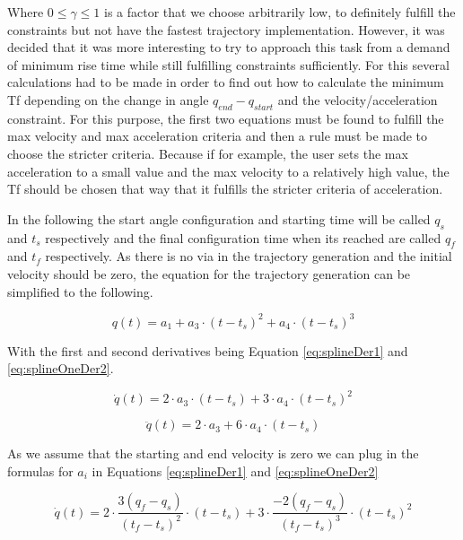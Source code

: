 Where $ 0\leq \gamma \leq 1$ is a factor that we choose arbitrarily low, to definitely fulfill the constraints but not have the fastest trajectory implementation. \newline 
However, it was decided that it was more interesting to try to approach this task from a demand of minimum rise time while still fulfilling constraints sufficiently. For this several calculations had to be made in order to find out how to calculate the minimum Tf depending on the change in angle $q_{end}- q_{start}$ and the velocity/acceleration constraint. For this purpose, the first two equations must be found to fulfill the max velocity and max acceleration criteria and then a rule must be made to choose the stricter criteria. Because if for example, the user sets the max acceleration to a small value and the max velocity to a relatively high value, the Tf should be chosen that way that it fulfills the stricter criteria of acceleration. 

\newline 
In the following the start angle configuration and starting time will be called $q_s$ and $t_s$ respectively and the final configuration time when its reached are called $q_f$ and $t_f$ respectively.
As there is no via in the trajectory generation and the initial velocity should be zero, the equation for the trajectory generation can be simplified to the following.

\begin{equation}
    q(t) = a_{1} + a_{3} \cdot (t-t_{s})^2 + a_{4}\cdot (t-t_{s})^3
    \label{eq:splineOneAdj}
\end{equation}

With the first and second derivatives being Equation \ref{eq:splineDer1} and \ref{eq:splineOneDer2}. 

\begin{equation}
    \dot{q}(t) =  2\cdot a_{3} \cdot (t-t_{s}) + 3 \cdot a_{4}\cdot (t-t_{s})^2
    \label{eq:splineDer1}
\end{equation}

\begin{equation}
    \ddot{q}(t) = 2\cdot a_{3} + 6 \cdot a_{4}\cdot (t-t_{s})
    \label{eq:splineOneDer2}
\end{equation}

As we assume that the starting and end velocity is zero we can plug in the formulas for $a_{i}$ in Equations \ref{eq:splineDer1} and \ref{eq:splineOneDer2}

\begin{equation}
    \dot{q}(t) =  2 \cdot \frac{3(q_{f}-q_{s})}{(t_{f}-t_{s})^2} \cdot (t-t_{s}) + 3 \cdot \frac{-2(q_{f}-q_{s})}{(t_{f}-t_{s})^3}\cdot (t-t_{s})^2
    \label{eq:splineDer1A}
\end{equation}

